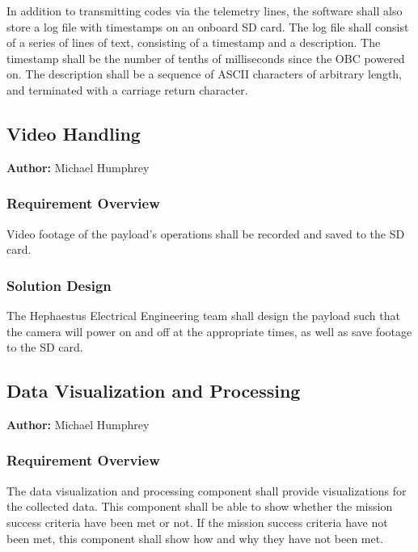 \documentclass[letterpaper,10pt]{article}
\begin{document}
In addition to transmitting codes via the telemetry lines, the software shall also
store a log file with timestamps on an onboard SD card.
The log file shall consist of a series of lines of text, consisting of a timestamp
and a description.
The timestamp shall be the number of tenths of milliseconds since the \gls{OBC}
powered on.
The description shall be a sequence of \gls{ASCII} characters of arbitrary length,
and terminated with a carriage return character.

\subsection{Video Handling}
\textbf{Author:} Michael Humphrey
\subsubsection{Requirement Overview}
Video footage of the \gls{payload}'s operations shall be recorded and saved to the
SD card.

\subsubsection{Solution Design}
The Hephaestus Electrical Engineering team shall design the payload such that the 
camera will power on and off at the appropriate times, as well as save footage to
the SD card. 

\subsection{Data Visualization and Processing}
\textbf{Author:} Michael Humphrey
\subsubsection{Requirement Overview}
The data visualization and processing component shall provide visualizations
for the collected data.
This component shall be able to show whether the mission success criteria have
been met or not.
If the mission success criteria have not been met, this component shall show how
and why they have not been met.
\end{document}
